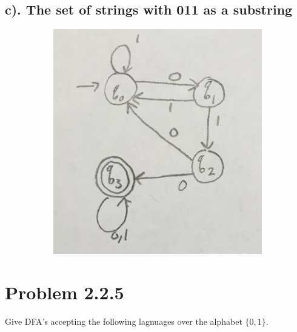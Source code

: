 \documentclass[20pt]{article} %
\begin{document}
\subsection{c). The set of strings with 011 as a substring}
\begin{figure}[!htbp]
  	\centering
   	\begin{subfigure}[p]{0.6\linewidth}
    	\includegraphics[width=\linewidth]{./figures/H1-1c.jpg}
   	\end{subfigure}
\end{figure} 
\newpage
\section{Problem 2.2.5}
Give DFA's accepting the following lagnuages over the alphabet $\{0,1\}$.
\end{document}
